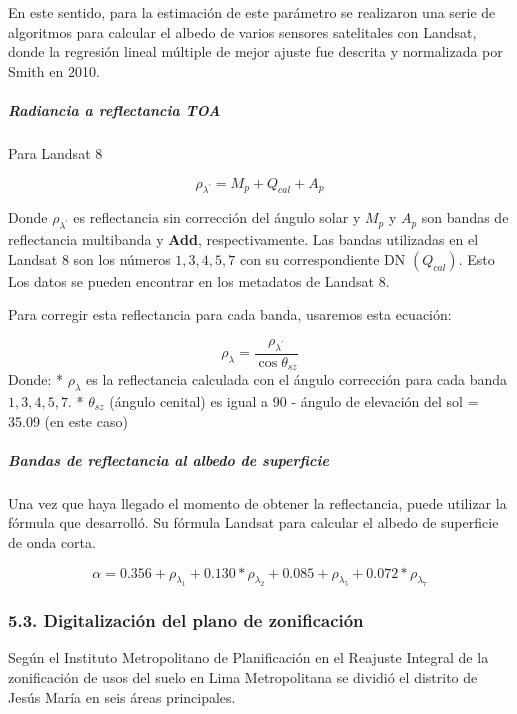 \documentclass[
]{article}
\begin{document}
En este sentido, para la estimación de este parámetro se realizaron una
serie de algoritmos para calcular el albedo de varios sensores
satelitales con Landsat, donde la regresión lineal múltiple de mejor
ajuste fue descrita y normalizada por Smith en 2010.

\hypertarget{radiancia-a-reflectancia-toa}{%
\subparagraph{\texorpdfstring{\emph{Radiancia a reflectancia
TOA}}{Radiancia a reflectancia TOA}}\label{radiancia-a-reflectancia-toa}}

Para Landsat 8

\[ \rho_{\lambda^{'}} = M_{p} + Q_{cal} + A_{p} \]

Donde \(\rho_{\lambda^{'}}\) es reflectancia sin corrección del ángulo
solar y \(M_{p}\) y \(A_{p}\) son bandas de reflectancia multibanda y
\textbf{Add}, respectivamente. Las bandas utilizadas en el Landsat 8 son
los números \(1,3,4,5,7\) con su correspondiente DN \((Q_{cal})\). Esto
Los datos se pueden encontrar en los metadatos de Landsat 8.

Para corregir esta reflectancia para cada banda, usaremos esta ecuación:

\[\rho_{\lambda} = \frac{\rho_{\lambda^{'}}}{\cos{\theta_{sz}}}\] Donde:
* \(\rho_{\lambda}\) es la reflectancia calculada con el ángulo
corrección para cada banda \(1,3,4,5,7\). * \(\theta_{sz}\) (ángulo
cenital) es igual a 90 - ángulo de elevación del sol = 35.09 (en este
caso)

\hypertarget{bandas-de-reflectancia-al-albedo-de-superficie}{%
\subparagraph{\texorpdfstring{\emph{Bandas de reflectancia al albedo de
superficie}}{Bandas de reflectancia al albedo de superficie}}\label{bandas-de-reflectancia-al-albedo-de-superficie}}

Una vez que haya llegado el momento de obtener la reflectancia, puede
utilizar la fórmula que desarrolló. Su fórmula Landsat para calcular el
albedo de superficie de onda corta.

\[\alpha = 0.356 + \rho_{\lambda_{1}} + 0.130 * \rho_{\lambda_{2}} + 0.085 +\rho_{\lambda_{5}} + 0.072 * \rho_{\lambda_{7}}\]

\hypertarget{digitalizaciuxf3n-del-plano-de-zonificaciuxf3n}{%
\subsubsection{5.3. Digitalización del plano de
zonificación}\label{digitalizaciuxf3n-del-plano-de-zonificaciuxf3n}}

Según el Instituto Metropolitano de Planificación en el Reajuste
Integral de la zonificación de usos del suelo en Lima Metropolitana se
dividió el distrito de Jesús María en seis áreas principales.
\end{document}
